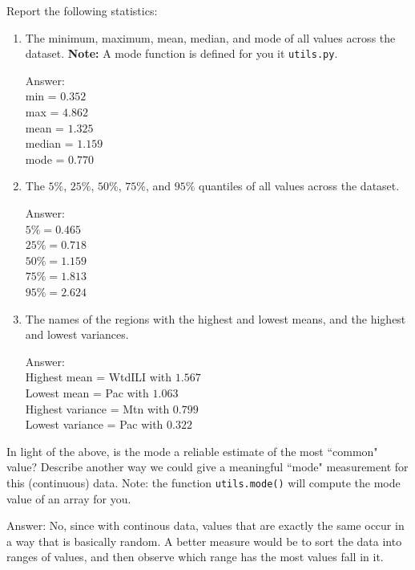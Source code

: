 \documentclass{article}
\newcommand{\blu}[1]{{\textcolor{blu}{#1}}}
\newenvironment{answer}{\par\begingroup\color{gre}Answer: }{\endgroup}
\let\ask\blu
\begin{document}
  \ask{Report the following statistics}:
  \begin{enumerate}
  \item The minimum, maximum, mean, median, and mode of all values across the dataset. \textbf{Note:} A mode function is defined for you it \texttt{utils.py}.
  \begin{answer} \\
    min = $0.352$ \\
    max = $4.862$ \\
    mean = $1.325$ \\
    median = $1.159$ \\
    mode = $0.770$
  \end{answer}
  \item The $5\%$, $25\%$, $50\%$, $75\%$, and $95\%$ quantiles of all values across the dataset.
  \begin{answer} \\
    $5\% = 0.465$ \\
    $25\% = 0.718$ \\
    $50\% = 1.159$ \\
    $75\% = 1.813$ \\
    $95\% = 2.624$
  \end{answer}
  \item The names of the regions with the highest and lowest means, and the highest and lowest variances.
  \begin{answer} \\
    Highest mean  = WtdILI with $1.567$ \\
    Lowest mean  = Pac with $1.063$ \\
    Highest variance  = Mtn with $0.799$ \\
    Lowest variance = Pac with $0.322$ 

  \end{answer}
  \end{enumerate}
  In light of the above, \ask{is the mode a reliable estimate of the most ``common" value? Describe another way we could give a meaningful ``mode" measurement for this (continuous) data.} Note: the function \texttt{utils.mode()} will compute the mode value of an array for you.
  \begin{answer}
    No, since with continous data, values that are exactly the same occur in a way that is basically random. A better measure would be to sort the data into ranges of values, and then observe which range has the most values fall in it.
  \end{answer}
\end{document}
